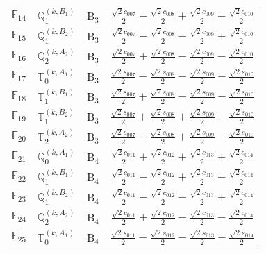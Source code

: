 \documentclass[fleqn,10pt,landscape]{article}
\begin{document}
\begin{itemize}
\begin{center}
\begin{longtable}{c|c|c|c}
$ \mathbb{F}_{14} $ & $\mathbb{Q}_{1}^{(k,B_{1})}$ & B$_{3}$ & $\frac{\sqrt{2} c_{007}}{2} - \frac{\sqrt{2} c_{008}}{2} + \frac{\sqrt{2} c_{009}}{2} - \frac{\sqrt{2} c_{010}}{2}$ \\
$ \mathbb{F}_{15} $ & $\mathbb{Q}_{1}^{(k,B_{2})}$ & B$_{3}$ & $\frac{\sqrt{2} c_{007}}{2} - \frac{\sqrt{2} c_{008}}{2} - \frac{\sqrt{2} c_{009}}{2} + \frac{\sqrt{2} c_{010}}{2}$ \\
$ \mathbb{F}_{16} $ & $\mathbb{Q}_{2}^{(k,A_{2})}$ & B$_{3}$ & $\frac{\sqrt{2} c_{007}}{2} + \frac{\sqrt{2} c_{008}}{2} - \frac{\sqrt{2} c_{009}}{2} - \frac{\sqrt{2} c_{010}}{2}$ \\
$ \mathbb{F}_{17} $ & $\mathbb{T}_{0}^{(k,A_{1})}$ & B$_{3}$ & $\frac{\sqrt{2} s_{007}}{2} - \frac{\sqrt{2} s_{008}}{2} - \frac{\sqrt{2} s_{009}}{2} + \frac{\sqrt{2} s_{010}}{2}$ \\
$ \mathbb{F}_{18} $ & $\mathbb{T}_{1}^{(k,B_{1})}$ & B$_{3}$ & $\frac{\sqrt{2} s_{007}}{2} + \frac{\sqrt{2} s_{008}}{2} - \frac{\sqrt{2} s_{009}}{2} - \frac{\sqrt{2} s_{010}}{2}$ \\
$ \mathbb{F}_{19} $ & $\mathbb{T}_{1}^{(k,B_{2})}$ & B$_{3}$ & $\frac{\sqrt{2} s_{007}}{2} + \frac{\sqrt{2} s_{008}}{2} + \frac{\sqrt{2} s_{009}}{2} + \frac{\sqrt{2} s_{010}}{2}$ \\
$ \mathbb{F}_{20} $ & $\mathbb{T}_{2}^{(k,A_{2})}$ & B$_{3}$ & $\frac{\sqrt{2} s_{007}}{2} - \frac{\sqrt{2} s_{008}}{2} + \frac{\sqrt{2} s_{009}}{2} - \frac{\sqrt{2} s_{010}}{2}$ \\ \hline
$ \mathbb{F}_{21} $ & $\mathbb{Q}_{0}^{(k,A_{1})}$ & B$_{4}$ & $\frac{\sqrt{2} c_{011}}{2} + \frac{\sqrt{2} c_{012}}{2} + \frac{\sqrt{2} c_{013}}{2} + \frac{\sqrt{2} c_{014}}{2}$ \\
$ \mathbb{F}_{22} $ & $\mathbb{Q}_{1}^{(k,B_{1})}$ & B$_{4}$ & $\frac{\sqrt{2} c_{011}}{2} - \frac{\sqrt{2} c_{012}}{2} + \frac{\sqrt{2} c_{013}}{2} - \frac{\sqrt{2} c_{014}}{2}$ \\
$ \mathbb{F}_{23} $ & $\mathbb{Q}_{1}^{(k,B_{2})}$ & B$_{4}$ & $\frac{\sqrt{2} c_{011}}{2} - \frac{\sqrt{2} c_{012}}{2} - \frac{\sqrt{2} c_{013}}{2} + \frac{\sqrt{2} c_{014}}{2}$ \\
$ \mathbb{F}_{24} $ & $\mathbb{Q}_{2}^{(k,A_{2})}$ & B$_{4}$ & $\frac{\sqrt{2} c_{011}}{2} + \frac{\sqrt{2} c_{012}}{2} - \frac{\sqrt{2} c_{013}}{2} - \frac{\sqrt{2} c_{014}}{2}$ \\
$ \mathbb{F}_{25} $ & $\mathbb{T}_{0}^{(k,A_{1})}$ & B$_{4}$ & $\frac{\sqrt{2} s_{011}}{2} - \frac{\sqrt{2} s_{012}}{2} - \frac{\sqrt{2} s_{013}}{2} + \frac{\sqrt{2} s_{014}}{2}$ \\

\end{longtable}
\end{center}
\end{itemize}
\end{document}
